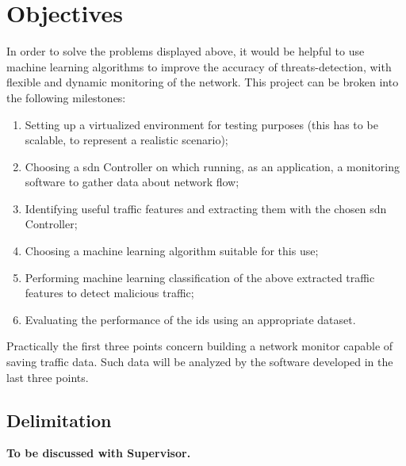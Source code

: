 
\section{Objectives}
\label{sec:objectives}

In order to solve the problems displayed above, it would be helpful to use machine learning algorithms to improve the accuracy of threats-detection, with flexible and dynamic monitoring of the network. This project can be broken into the following milestones:

\begin{enumerate}
    \item Setting up a virtualized environment for testing purposes (this has to be scalable, to represent a realistic scenario);
    \item Choosing a \gls{sdn} Controller on which running, as an application, a monitoring software to gather data about network flow;
    \item Identifying useful traffic features and extracting them with the chosen \gls{sdn} Controller;
    \item Choosing a machine learning algorithm suitable for this use;
    \item Performing machine learning classification of the above extracted traffic features to detect malicious traffic;
    \item Evaluating the performance of the \gls{ids} using an appropriate dataset.
\end{enumerate}
Practically the first three points concern building a network monitor capable of saving traffic data. Such data will be analyzed by the software developed in the last three points.


\subsection{Delimitation}
\label{subsec:delimitation}

\faEdit \quad \textbf{To be discussed with Supervisor.} \\

\textcolor{dimgray}{\lipsum[1-2]}

